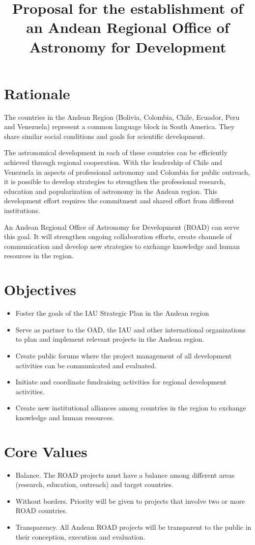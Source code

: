 \documentclass[12pt]{article}
\title{Proposal for the establishment of an Andean Regional Office of Astronomy for Development}
\begin{document}
\maketitle
\tableofcontents
\section{Rationale}

The countries in the Andean Region (Bolivia, Colombia, Chile, Ecuador,
Peru and Venezuela) represent a common language block in South
America. They share similar social conditions and goals for scientific
development.  

The astronomical development in each of these countries can be
efficiently achieved through regional cooperation. With the leadership
of Chile and Venezuela in aspects of professional astronomy and
Colombia for public outreach, it is possible to develop strategies to
strengthen the professional research, education and popularization of
astronomy in the Andean region. This development effort requires the
commitment and shared effort from different institutions. 

An Andean Regional Office of Astronomy for Development (ROAD) can
serve this goal.  It will strengthen ongoing collaboration efforts,
create channels of communication and develop new strategies to
exchange knowledge and human resources in the region.  

\section{Objectives}
\begin{itemize}
\item
Foster the goals of the IAU Strategic Plan in the Andean region
\item
Serve as partner to the OAD, the IAU and other international
organizations to plan and implement relevant projects in the Andean
region. 
\item
Create public forums where the project management of all development
activities can be communicated and evaluated. 
\item
Initiate and coordinate fundraising activities for regional
development activities. 
\item
Create new institutional alliances among countries in the region to
exchange knowledge and human resources. 
\end{itemize}

\section{Core Values}
\begin{itemize}
\item 
Balance. The ROAD projects must have a balance among different areas
(research, education, outreach) and target countries. 
\item
Without borders. Priority will be given to projects that involve two
or more ROAD countries. 
\item
Transparency. All Andean ROAD projects will be transparent to the
public in their conception, execution and evaluation. 
\end{itemize}
\end{document}

